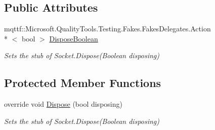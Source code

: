 \subsection*{Public Attributes}
\begin{DoxyCompactItemize}
\item 
mqttf\-::\-Microsoft.\-Quality\-Tools.\-Testing.\-Fakes.\-Fakes\-Delegates.\-Action\\*
$<$ bool $>$ \hyperlink{class_system_1_1_net_1_1_sockets_1_1_fakes_1_1_stub_socket_a7a770dfc5638c1feee0f5ce54d6ef5f0}{Dispose\-Boolean}
\begin{DoxyCompactList}\small\item\em Sets the stub of Socket.\-Dispose(\-Boolean disposing)\end{DoxyCompactList}\end{DoxyCompactItemize}
\subsection*{Protected Member Functions}
\begin{DoxyCompactItemize}
\item 
override void \hyperlink{class_system_1_1_net_1_1_sockets_1_1_fakes_1_1_stub_socket_a1d7d6f1163fec4263e003c6c25615905}{Dispose} (bool disposing)
\begin{DoxyCompactList}\small\item\em Sets the stub of Socket.\-Dispose(\-Boolean disposing)\end{DoxyCompactList}\end{DoxyCompactItemize}
